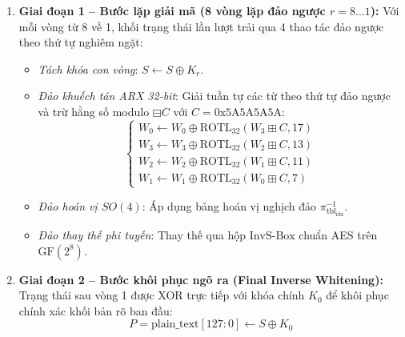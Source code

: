 \documentclass[10pt,twocolumn]{article}
\begin{document}
\begin{enumerate}
    \item \textbf{Giai đoạn 1 -- Bước lặp giải mã (8 vòng lặp đảo ngược $r = 8 \dots 1$):} Với mỗi vòng từ 8 về 1, khối trạng thái lần lượt trải qua 4 thao tác đảo ngược theo thứ tự nghiêm ngặt:
    \begin{itemize}
        \item \emph{Tách khóa con vòng}: $S \leftarrow S \oplus K_r$.
        \item \emph{Đảo khuếch tán ARX 32-bit}: Giải tuần tự các từ theo thứ tự đảo ngược và trừ hằng số modulo $\boxminus C$ với $C = \text{0x5A5A5A5A}$:
        \begin{equation}
        \begin{cases}
            W_0 \leftarrow W_0 \oplus \text{ROTL}_{32}(W_3 \boxplus C, 17) \\
            W_3 \leftarrow W_3 \oplus \text{ROTL}_{32}(W_2 \boxplus C, 13) \\
            W_2 \leftarrow W_2 \oplus \text{ROTL}_{32}(W_1 \boxplus C, 11) \\
            W_1 \leftarrow W_1 \oplus \text{ROTL}_{32}(W_0 \boxplus C, 7)
        \end{cases}
        \end{equation}
        \item \emph{Đảo hoán vị $SO(4)$}: Áp dụng bảng hoán vị nghịch đảo $\pi_{\text{tbl}_{\text{idx}}}^{-1}$.
        \item \emph{Đảo thay thế phi tuyến}: Thay thế qua hộp $\text{InvS-Box}$ chuẩn AES trên $\text{GF}(2^8)$.
    \end{itemize}
    
    \item \textbf{Giai đoạn 2 -- Bước khôi phục ngõ ra (Final Inverse Whitening):} Trạng thái sau vòng 1 được XOR trực tiếp với khóa chính $K_0$ để khôi phục chính xác khối bản rõ ban đầu:
    \begin{equation}
        P = \text{plain\_text}[127:0] \leftarrow S \oplus K_0
    \end{equation}
\end{enumerate}
\end{document}
